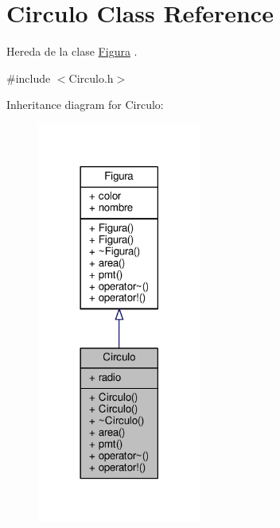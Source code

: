 \hypertarget{class_circulo}{\section{Circulo Class Reference}
\label{class_circulo}
}


Hereda de la clase \hyperlink{class_figura}{Figura} .  




{\ttfamily \#include $<$Circulo.\+h$>$}



Inheritance diagram for Circulo\+:\nopagebreak
\begin{figure}[H]
\begin{center}
\leavevmode
\includegraphics[width=153pt]{class_circulo__inherit__graph}
\end{center}
\end{figure}

